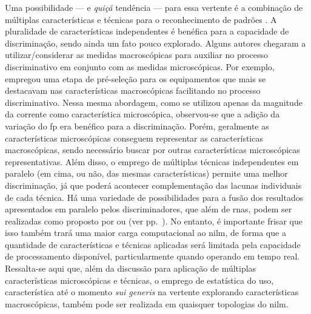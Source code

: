 Uma possibilidade --- e \emph{quiçá} tendência --- para essa vertente é a
combinação de múltiplas características e técnicas para o
reconhecimento de padrões \cite{
nilm_zeifman_vast_hisample_pdfmerge_2011,nilm_liang_pt1_2010_34,
nilm_liang_pt2_2010_40}. A pluralidade de características
independentes é benéfica para a capacidade de discriminação, sendo
ainda um fato pouco explorado. Alguns autores chegaram a
utilizar/considerar as medidas macroscópicas para auxiliar no processo
discriminativo em conjunto com as medidas microscópicas. Por exemplo, 
\cite{nilm_coppe_nascimento} empregou uma etapa de pré-seleção para os
equipamentos que mais se destacavam nas características macroscópicas
facilitando no processo discriminativo. Nessa mesma abordagem, como se
utilizou apenas da magnitude da corrente como característica
microscópica, observou-se que a adição da variação do \gls{fp} era
benéfico para a discriminação. Porém, geralmente as características
microscópicas conseguem representar as características macroscópicas,
sendo necessário buscar por outras características microscópicas
representativas. Além disso, o emprego de múltiplas técnicas
independentes em paralelo (em cima, ou não, das mesmas características)
permite uma melhor discriminação, já que poderá acontecer
complementação das lacunas individuais de cada técnica. Há uma
variedade de possibilidades para a fusão dos resultados apresentados em
paralelo pelos discriminadores, que além de \glspl{rna}, podem ser
realizadas como proposto por \cite{nilm_liang_pt1_2010_34} ou
\cite{nilm_zeifman_review_2011} (ver
pp.~\pageref{text:uniao_tecnicas}). No entanto, é importante frisar que
isso também trará uma maior carga computacional ao \gls{nilm}, de
forma que a quantidade de características e técnicas aplicadas será
limitada pela capacidade de processamento disponível, particularmente
quando operando em tempo real. Ressalta-se aqui que, além da discussão
para aplicação de múltiplas características microscópicas e técnicas,
o emprego de estatística do uso, característica até o momento
\emph{sui generis} na vertente explorando características
macroscópicas, também pode ser realizada em quaisquer topologias do
\gls{nilm}.

